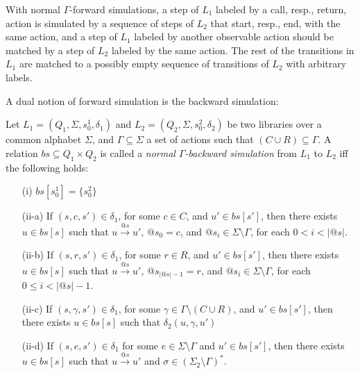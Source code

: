 With normal $\Gamma$-forward simulations, a step of $L_1$ labeled by a call, resp., return, action is simulated by a sequence of steps of $L_2$ that start, resp., end, with the same action, and a step of $L_1$ labeled by another observable action should be matched by a step of $L_2$ labeled by the same action. The rest of the transitions in $L_1$ are matched to a possibly empty sequence of transitions of $L_2$ with arbitrary labels.

A dual notion of forward simulation is the backward simulation:
\begin{definition}\label{def:back_app}
Let $L_1=(Q_1,\Sigma, s_0^1, \delta_1)$ and $L_2=(Q_2,\Sigma, s_0^2, \delta_2)$ be two libraries over a common alphabet $\Sigma$, and $\Gamma\subseteq \Sigma$ a set of actions such that $(C\cup R)\subseteq \Gamma$. A relation $bs \subseteq Q_1 \times Q_2$ is called a \emph{normal $\Gamma$-backward simulation} from $L_1$ to $L_2$ iff the following holds:
\begin{itemize}
\item[(i)] $bs[s_0^1] = \{s_0^2 \}$
\item[(ii-a)] If $(s,c,s') \in \delta_1$, for some $c\in C$, and $u' \in bs[s']$, then there exists $u \in bs[s]$ such that $u \xrightarrow{@s} u'$, $@s_0=c$, and $@s_i\in \Sigma\setminus\Gamma$, for each $0<i<|@s|$.
\item[(ii-b)] If $(s,r,s') \in \delta_1$, for some $r\in R$, and $u' \in bs[s']$, then there exists $u \in bs[s]$ such that $u \xrightarrow{@s} u'$, $@s_{|@s| -1}=r$, and $@s_i\in \Sigma\setminus\Gamma$, for each $0\leq i<|@s| -1$.
\item[(ii-c)] If $(s,\gamma, s') \in \delta_1$, for some $\gamma\in \Gamma\setminus (C\cup R)$, and $u' \in bs[s']$, then there exists $u \in bs[s]$ such that $\delta_2(u,\gamma,u')$
\item[(ii-d)] If $(s,e,s') \in \delta_1$ for some $e \in \Sigma\setminus \Gamma$ and $u' \in bs[s']$, then there exists $u \in bs[s]$ such that $u \xrightarrow{@s} u'$ and $\sigma\in (\Sigma_2\setminus\Gamma)^*$.
\end{itemize}
\end{definition}

